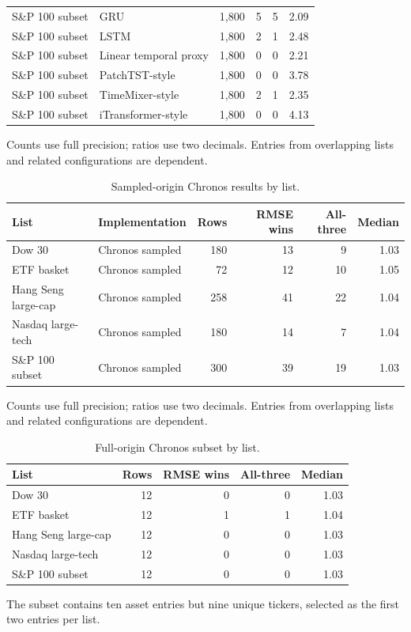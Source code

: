 \begin{table}[htbp]
\begin{tabular}{llrrrr}
S\&P 100 subset & GRU & 1,800 & 5 & 5 & 2.09 \\
S\&P 100 subset & LSTM & 1,800 & 2 & 1 & 2.48 \\
S\&P 100 subset & Linear temporal proxy & 1,800 & 0 & 0 & 2.21 \\
S\&P 100 subset & PatchTST-style & 1,800 & 0 & 0 & 3.78 \\
S\&P 100 subset & TimeMixer-style & 1,800 & 2 & 1 & 2.35 \\
S\&P 100 subset & iTransformer-style & 1,800 & 0 & 0 & 4.13 \\
\bottomrule
\end{tabular}
\par\smallskip\parbox{0.97\linewidth}{\footnotesize Counts use full precision; ratios use two decimals. Entries from overlapping lists and related configurations are dependent.}
\end{table}

\begin{table}[htbp]
\centering
\caption{Sampled-origin Chronos results by list.}
\label{tab:zero_market}
\small
\setlength{\tabcolsep}{4pt}
\begin{tabular}{llrrrr}
\toprule
List & Implementation & Rows & RMSE wins & All-three & Median \\
\midrule
Dow 30 & Chronos sampled & 180 & 13 & 9 & 1.03 \\
ETF basket & Chronos sampled & 72 & 12 & 10 & 1.05 \\
Hang Seng large-cap & Chronos sampled & 258 & 41 & 22 & 1.04 \\
Nasdaq large-tech & Chronos sampled & 180 & 14 & 7 & 1.04 \\
S\&P 100 subset & Chronos sampled & 300 & 39 & 19 & 1.03 \\
\bottomrule
\end{tabular}
\par\smallskip\parbox{0.97\linewidth}{\footnotesize Counts use full precision; ratios use two decimals. Entries from overlapping lists and related configurations are dependent.}
\end{table}

\begin{table}[htbp]
\centering
\caption{Full-origin Chronos subset by list.}
\label{tab:full_subset}
\small
\setlength{\tabcolsep}{4pt}
\begin{tabular}{lrrrr}
\toprule
List & Rows & RMSE wins & All-three & Median \\
\midrule
Dow 30 & 12 & 0 & 0 & 1.03 \\
ETF basket & 12 & 1 & 1 & 1.04 \\
Hang Seng large-cap & 12 & 0 & 0 & 1.03 \\
Nasdaq large-tech & 12 & 0 & 0 & 1.03 \\
S\&P 100 subset & 12 & 0 & 0 & 1.03 \\
\bottomrule
\end{tabular}
\par\smallskip\parbox{0.97\linewidth}{\footnotesize The subset contains ten asset entries but nine unique tickers, selected as the first two entries per list.}
\end{table}

